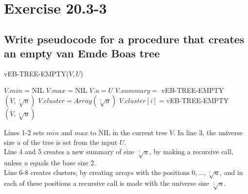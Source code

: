 \section*{Exercise 20.3-3}
\subsection*{Write pseudocode for a procedure that creates an empty van Emde Boas tree}

\begin{algorithm}[H]
\caption*{vEB-TREE-EMPTY($V,U$)}
\begin{algorithmic}[1]
\State $V.min$ = NIL
\State $V.max$ = NIL
\State $V.u = U$
\State $V.summary =$ vEB-TREE-EMPTY$(V, \sqrt[\uparrow]{u})$
\State $V.cluster = Array(\sqrt[\uparrow]{u})$
\State $V.cluster[i] = $vEB-TREE-EMPTY$(V, \sqrt[\downarrow]{u})$
\EndFor
\EndIf
\end{algorithmic}
\end{algorithm}

Lines 1-2 sets $min$ and $max$ to NIL in the current tree $V$. In line 3, the universe size $u$ of the tree is set from the input $U$.
\\
Line 4 and 5 creates a new summary of size $\sqrt[\uparrow]{u}$, by making a recursive call, unless $u$ equals the base size 2.
\\
Line 6-8 creates clusters, by creating arrays with the positions $0,...,\sqrt[\uparrow]{u}$, and in each of these positions a recursive call is made with the universe size $\sqrt[\downarrow]{u}$.
